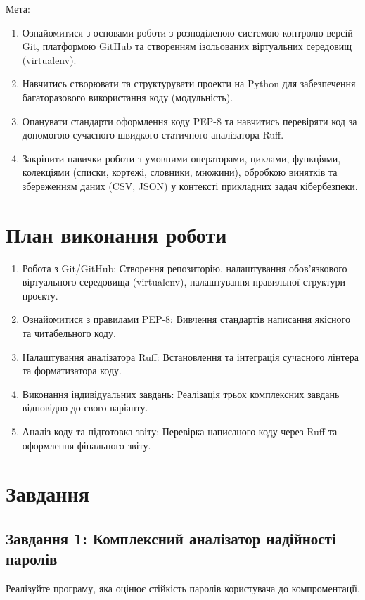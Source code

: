\documentclass[12pt, a4paper]{article}
\begin{document}

Мета:
\begin{enumerate}
	\item Ознайомитися з основами роботи з розподіленою системою контролю версій Git, платформою GitHub та створенням ізольованих віртуальних середовищ (virtualenv).
	\item Навчитись створювати та структурувати проекти на Python для забезпечення багаторазового використання коду (модульність).
	\item Опанувати стандарти оформлення коду PEP-8 та навчитись перевіряти код за допомогою сучасного швидкого статичного аналізатора Ruff.
	\item Закріпити навички роботи з умовними операторами, циклами, функціями, колекціями (списки, кортежі, словники, множини), обробкою винятків та збереженням даних (CSV, JSON) у контексті прикладних задач кібербезпеки.
\end{enumerate}
\section{План виконання роботи}
\begin{enumerate}
	\item Робота з Git/GitHub: Створення репозиторію, налаштування обов'язкового віртуального середовища (virtualenv), налаштування правильної структури проєкту.
	\item Ознайомитися з правилами PEP-8: Вивчення стандартів написання якісного та читабельного коду.
	\item Налаштування аналізатора Ruff: Встановлення та інтеграція сучасного лінтера та форматизатора коду.
	\item Виконання індивідуальних завдань: Реалізація трьох комплексних завдань відповідно до свого варіанту.
	\item Аналіз коду та підготовка звіту: Перевірка написаного коду через Ruff та оформлення фінального звіту.
\end{enumerate}

\section{Завдання}
\subsection{Завдання 1: Комплексний аналізатор надійності паролів}
Реалізуйте програму, яка оцінює стійкість паролів користувача до компроментації.
\end{document}
